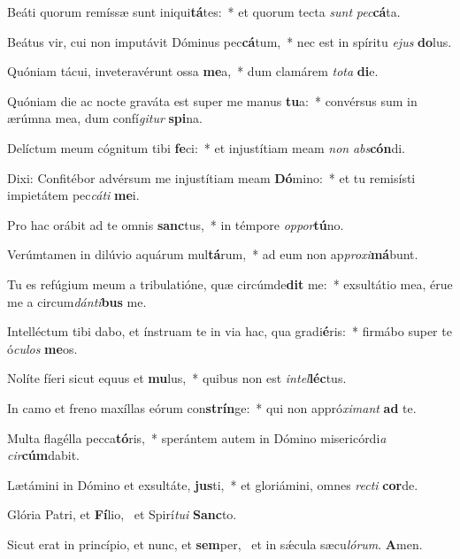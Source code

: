 \item Beáti quorum remíssæ sunt iniqui\textbf{tá}tes:~* et quorum tecta \textit{sunt} \textit{pec}\textbf{cá}ta.
\item Beátus vir, cui non imputávit Dóminus pec\textbf{cá}tum,~* nec est in spíritu \textit{e}\textit{jus} \textbf{do}lus.
\item Quóniam tácui, inveteravérunt ossa \textbf{me}a,~* dum clamárem \textit{to}\textit{ta} \textbf{di}e.
\item Quóniam die ac nocte graváta est super me manus \textbf{tu}a:~* convérsus sum in ærúmna mea, dum confí\textit{gi}\textit{tur} \textbf{spi}na.
\item Delíctum meum cógnitum tibi \textbf{fe}ci:~* et injustítiam meam \textit{non} \textit{abs}\textbf{cón}di.
\item Dixi: Confitébor advérsum me injustítiam meam \textbf{Dó}mino:~* et tu remisísti impietátem pec\textit{cá}\textit{ti} \textbf{me}i.
\item Pro hac orábit ad te omnis \textbf{sanc}tus,~* in témpore \textit{op}\textit{por}\textbf{tú}no.
\item Verúmtamen in dilúvio aquárum mul\textbf{tá}rum,~* ad eum non ap\textit{pro}\textit{xi}\textbf{má}bunt.
\item Tu es refúgium meum a tribulatióne, quæ circúmde\textbf{dit} me:~* exsultátio mea, érue me a circum\textit{dán}\textit{ti}\textbf{bus} me.
\item Intelléctum tibi dabo, et ínstruam te in via hac, qua gradi\textbf{é}ris:~* firmábo super te ó\textit{cu}\textit{los} \textbf{me}os.
\item Nolíte fíeri sicut equus et \textbf{mu}lus,~* quibus non est \textit{in}\textit{tel}\textbf{léc}tus.
\item In camo et freno maxíllas eórum con\textbf{strín}ge:~* qui non appró\textit{xi}\textit{mant} \textbf{ad} te.
\item Multa flagélla pecca\textbf{tó}ris,~* sperántem autem in Dómino misericórdi\textit{a} \textit{cir}\textbf{cúm}dabit.
\item Lætámini in Dómino et exsultáte, \textbf{jus}ti,~* et gloriámini, omnes \textit{rec}\textit{ti} \textbf{cor}de.
\item Glória Patri, et \textbf{Fí}lio,~\psstar{} et Spirí\textit{tu}\textit{i} \textbf{Sanc}to.
\item Sicut erat in princípio, et nunc, et \textbf{sem}per,~\psstar{} et in sǽcula sæcu\textit{ló}\textit{rum}. \textbf{A}men.

